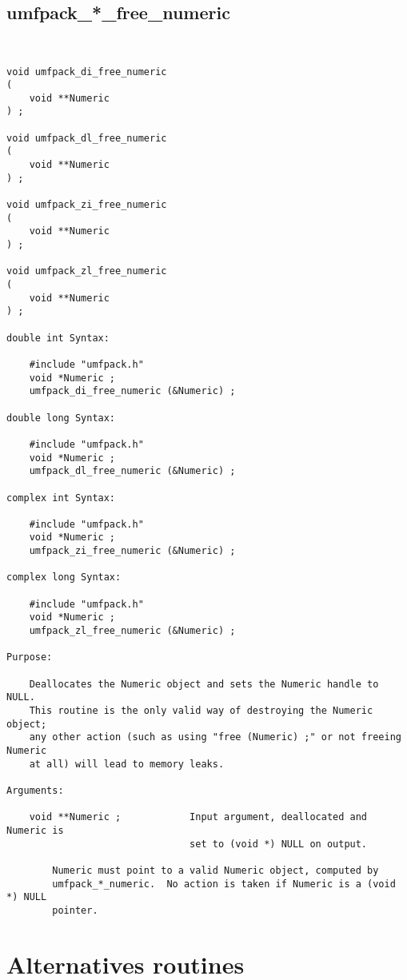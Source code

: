 \newpage
\subsection{umfpack\_*\_free\_numeric}

{\footnotesize
\begin{verbatim}


void umfpack_di_free_numeric
(
    void **Numeric
) ;

void umfpack_dl_free_numeric
(
    void **Numeric
) ;

void umfpack_zi_free_numeric
(
    void **Numeric
) ;

void umfpack_zl_free_numeric
(
    void **Numeric
) ;

double int Syntax:

    #include "umfpack.h"
    void *Numeric ;
    umfpack_di_free_numeric (&Numeric) ;

double long Syntax:

    #include "umfpack.h"
    void *Numeric ;
    umfpack_dl_free_numeric (&Numeric) ;

complex int Syntax:

    #include "umfpack.h"
    void *Numeric ;
    umfpack_zi_free_numeric (&Numeric) ;

complex long Syntax:

    #include "umfpack.h"
    void *Numeric ;
    umfpack_zl_free_numeric (&Numeric) ;

Purpose:

    Deallocates the Numeric object and sets the Numeric handle to NULL.
    This routine is the only valid way of destroying the Numeric object;
    any other action (such as using "free (Numeric) ;" or not freeing Numeric
    at all) will lead to memory leaks.

Arguments:

    void **Numeric ;            Input argument, deallocated and Numeric is
                                set to (void *) NULL on output.

        Numeric must point to a valid Numeric object, computed by
        umfpack_*_numeric.  No action is taken if Numeric is a (void *) NULL
        pointer.
\end{verbatim}
}

\newpage
\section{Alternatives routines}
\label{Alternative}


